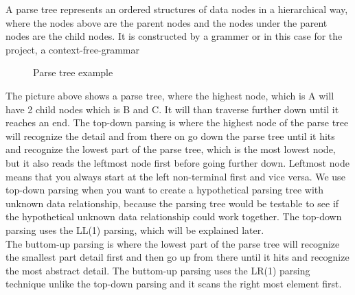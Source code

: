 A parse tree represents an ordered structures of data nodes in a hierarchical way, where the nodes above are the parent nodes and the nodes under the parent nodes are the child nodes. It is constructed by a grammer or in this case for the project, a context-free-grammar \\
\begin{figure}[H]
\centering
{}
\caption{Parse tree example}
\label{exampleparse}
\end{figure}

The picture above shows a parse tree, where the highest node, which is A will have 2 child nodes which is B and C. It will than traverse further down until it reaches an end.
The top-down parsing is where the highest node of the parse tree will recognize the detail and from there on go down the parse tree until it hits and recognize the lowest part of the parse tree, which is the most lowest node, but it also reads the leftmost node first before going further down. Leftmost node means that you always start at the left non-terminal first and vice versa. We use top-down parsing when you want to create a hypothetical parsing tree with unknown data relationship, because the parsing tree would be testable to see if the hypothetical unknown data relationship could work together. The top-down parsing uses the LL(1) parsing, which will be explained later\cite{conceptsOfProgrammingLanguages}. 
\\
The buttom-up parsing is where the lowest  part of the parse tree will recognize the smallest part detail first and then go up from there until it hits and recognize the most abstract detail. The buttom-up parsing uses the LR(1) parsing technique unlike the top-down parsing and it scans the right most element first\cite{conceptsOfProgrammingLanguages}. 

